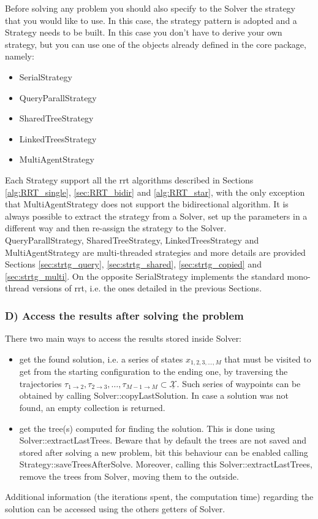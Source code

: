 Before solving any problem you should also specify to the Solver the strategy that you would like to use. In this case, the strategy pattern is adopted and a Strategy needs to be built. In this case you don't have to derive your own strategy, but you can use one of the objects already defined in the core package, namely:
\begin{itemize}
\item SerialStrategy
\item QueryParallStrategy
\item SharedTreeStrategy
\item LinkedTreesStrategy
\item MultiAgentStrategy
\end{itemize}
Each Strategy support all the rrt algorithms described in Sections \ref{alg:RRT_single}, \ref{sec:RRT_bidir} and \ref{alg:RRT_star}, with the only exception that MultiAgentStrategy does not support the bidirectional algorithm.
It is always possible to extract the strategy from a Solver, set up the parameters in a different way and then re-assign the strategy to the Solver.
\\
QueryParallStrategy, SharedTreeStrategy, LinkedTreesStrategy and MultiAgentStrategy are multi-threaded strategies and more details are provided Sections \ref{sec:strtg_query}, \ref{sec:strtg_shared}, \ref{sec:strtg_copied} and \ref{sec:strtg_multi}. On the opposite SerialStrategy implements the standard mono-thread versions of rrt, i.e. the ones detailed in the previous Sections.


\subsubsection{D) Access the results after solving the problem}

There two main ways to access the results stored inside Solver:
\begin{itemize}
\item get the found solution, i.e. a series of states $x_{1,2,3,\hdots,M}$ that must be visited to get from the starting configuration to the ending one, by traversing the trajectories $\tau_{1 \rightarrow 2 } , \tau_{2 \rightarrow 3}, \hdots ,\tau_{M-1 \rightarrow M} \subset \underline{\mathcal{X}}$. Such series of waypoints can be obtained by calling Solver::copyLastSolution. In case a solution was not found, an empty collection is returned.
\item get the tree(s) computed for finding the solution. This is done using Solver::extractLastTrees. Beware that by default the trees are not saved and stored after solving a new problem, bit this behaviour can be enabled calling Strategy::saveTreesAfterSolve.
Moreover, calling this Solver::extractLastTrees, remove the trees from Solver, moving them to the outside.
\end{itemize}
Additional information (the iterations spent, the computation time) regarding the solution can be accessed using the others getters of Solver.
